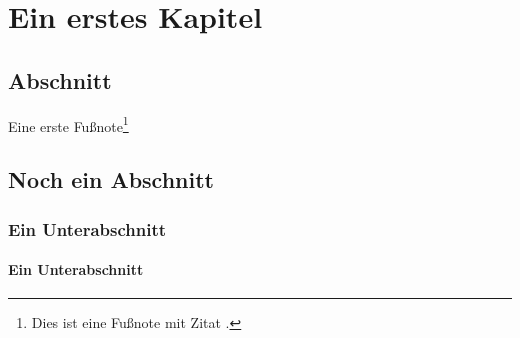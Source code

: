 \chapter{Ein erstes Kapitel}\label{chap:ErstesKapitel}

    \section{Abschnitt}
        \blindtext[4]

        Eine erste Fußnote\footnote{Dies ist eine Fußnote mit Zitat \cite[348, 349]{hau98}.}

    \section{Noch ein Abschnitt}
        \blindtext

        \subsection{Ein Unterabschnitt}
            \blindtext

            \subsubsection{Ein Unterabschnitt}
                \blindtext

                    \blindtext

                        \blindtext

                            \blindtext

                                \blindtext

                                    \blindtext

                                        \blindtext